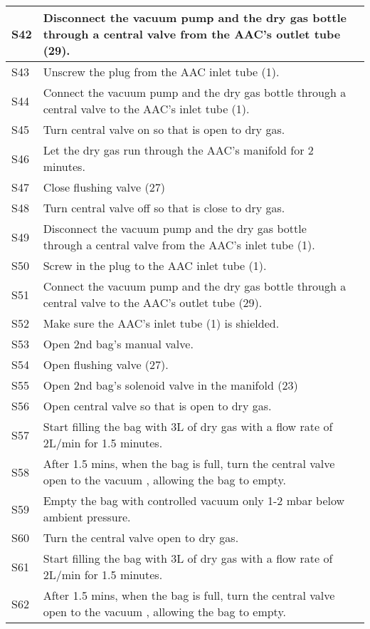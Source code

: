 \begin{longtable} {|m{}|m{}|m{}|}
S42 & Disconnect the vacuum pump and the dry gas bottle through a central valve from the AAC's outlet tube (29). & \\ \hline
S43 & Unscrew the plug from the AAC inlet tube (1). & \\ \hline
S44 & Connect the vacuum pump and the dry gas bottle through a central valve to the AAC's inlet tube (1). & \\ \hline
S45 & Turn central valve on so that is open to dry gas. & \\ \hline
S46 & Let the dry gas run through the AAC's manifold for 2 minutes. & \\ \hline
S47 & Close flushing valve (27) & \\ \hline
S48 & Turn central valve off so that is close to dry gas. & \\ \hline
S49 & Disconnect the vacuum pump and the dry gas bottle through a central valve from the AAC's inlet tube (1). & \\ \hline
S50 & Screw in the plug to the AAC inlet tube (1). & \\ \hline
S51 & Connect the vacuum pump and the dry gas bottle through a central valve to the AAC's outlet tube (29). & \\ \hline
S52 & Make sure the AAC's inlet tube (1) is shielded. & \\ \hline
S53 & Open 2nd bag's manual valve. & \\ \hline
S54 & Open flushing valve (27). & \\ \hline
S55 & Open 2nd bag's solenoid valve in the manifold (23) & \\ \hline
S56 & Open central valve so that is open to dry gas. & \\ \hline
S57 & Start filling the bag with 3L of dry gas with a flow rate of 2L/min for 1.5 minutes. & \\ \hline
S58 & After 1.5 mins, when the bag is full, turn the central valve open to the vacuum , allowing the bag to empty. & \\ \hline
S59 & Empty the bag with controlled vacuum only 1-2 mbar below ambient pressure. & \\ \hline
S60 & Turn the central valve open to dry gas. & \\ \hline
S61 & Start filling the bag with 3L of dry gas with a flow rate of 2L/min for 1.5 minutes. & \\ \hline
S62 & After 1.5 mins, when the bag is full, turn the central valve open to the vacuum , allowing the bag to empty. & \\ \hline

\end{longtable}
